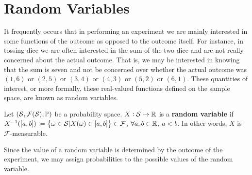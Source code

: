 \section{Random Variables}

It frequently occurs that in performing an experiment we are mainly interested in some functions of the outcome as opposed to the outcome itself. For instance, in tossing dice we are often interested in the sum of the two dice and are not really concerned about the actual outcome. That is, we may be interested in knowing that the sum is seven and not be concerned over whether the actual outcome was $(1, 6)$ or $(2, 5)$ or $(3, 4)$ or $(4, 3)$ or $(5, 2)$ or $(6, 1)$. These quantities of interest, or more formally, these real-valued functions defined on the sample space, are known as random variables. 

\begin{definition}
    Let $(\mathcal{S}, \mathcal{F}(\mathcal{S}), \mathbb{P})$ be a probability space. $X:\mathcal{S} \mapsto \mathbb{R}$ is a \textbf{random variable} if $X^{-1}([a,b]) := \left\{ \omega \in \mathcal{S}| X(\omega) \in [a,b] \right\} \in \mathcal{F}$, $\forall a, b \in \mathbb{R}$, $a < b$. In other words, $X$ is $\mathcal{F}$-measurable.
\end{definition}

Since the value of a random variable is determined by the outcome of the experiment, we may assign probabilities to the possible values of the random variable.